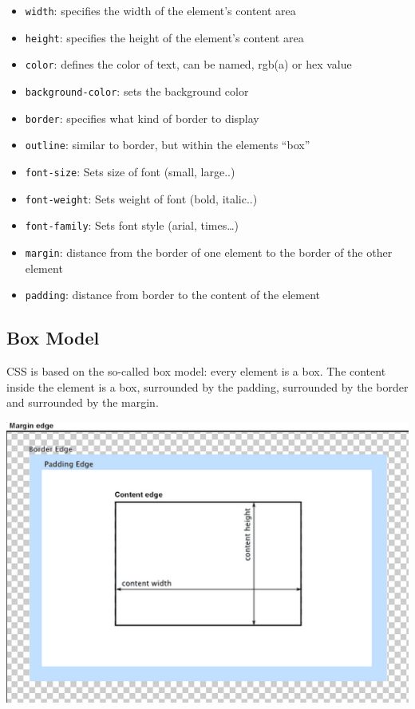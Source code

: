\documentclass[
]{book}
\providecommand{\tightlist}{%
  \setlength{\itemsep}{0pt}\setlength{\parskip}{0pt}}
\begin{document}
\begin{itemize}
\tightlist
\item
  \texttt{width}: specifies the width of the element's content area\\
\item
  \texttt{height}: specifies the height of the element's content area\\
\item
  \texttt{color}: defines the color of text, can be named, rgb(a) or hex value\\
\item
  \texttt{background-color}: sets the background color\\
\item
  \texttt{border}: specifies what kind of border to display\\
\item
  \texttt{outline}: similar to border, but within the elements ``box''\\
\item
  \texttt{font-size}: Sets size of font (small, large..)\\
\item
  \texttt{font-weight}: Sets weight of font (bold, italic..)\\
\item
  \texttt{font-family}: Sets font style (arial, times\ldots)\\
\item
  \texttt{margin}: distance from the border of one element to the border of the other element\\
\item
  \texttt{padding}: distance from border to the content of the element
\end{itemize}

\hypertarget{box-model}{%
\subsection*{Box Model}\label{box-model}}

CSS is based on the so-called box model: every element is a box. The content inside the element is a box, surrounded by the padding, surrounded by the border and surrounded by the margin.

\includegraphics{docs/assets/box-model.png}
\end{document}
